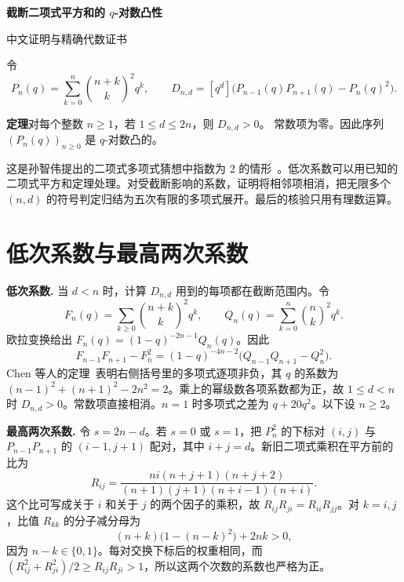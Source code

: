 \documentclass[11pt,UTF8,fontset=fandol,scheme=plain]{ctexart}
\newcommand{\coef}[1]{[q^{#1}]}
\newcommand{\Dx}{D_{n,d}}
\begin{document}
\thispagestyle{empty}
\vspace*{4mm}
{\LARGE\bfseries\color{proofInk}截断二项式平方和的 \(q\)-对数凸性\par}
\vspace{4mm}
{\normalsize\color{proofAccent}中文证明与精确代数证书\par}
\vspace{3mm}

令
\[
  P_n(q)=\sum_{k=0}^{n}\binom{n+k}{k}^{\!2}q^k,
  \qquad \Dx=\coef{d}\bigl(P_{n-1}(q)P_{n+1}(q)-P_n(q)^2\bigr).
\]
\noindent\colorbox{proofPale}{\begin{minipage}{\dimexpr\linewidth-2\fboxsep\relax}
  \vspace{3pt}\textbf{定理}\quad 对每个整数 \(n\ge1\)，若 \(1\le d\le2n\)，则 \(\Dx>0\)。
  常数项为零。因此序列 \((P_n(q))_{n\ge0}\) 是 \(q\)-对数凸的。\vspace{3pt}
\end{minipage}}

这是孙智伟提出的二项式多项式猜想中指数为 \(2\) 的情形~\cite[猜想 1.1(i)]{sun}。低次系数可以用已知的二项式平方和定理处理。对受截断影响的系数，证明将相邻项相消，把无限多个 \((n,d)\) 的符号判定归结为五次有限的多项式展开。最后的核验只用有理数运算。

\section{低次系数与最高两次系数}

\textbf{低次系数.}
当 \(d<n\) 时，计算 \(\Dx\) 用到的每项都在截断范围内。令
\[
  F_n(q)=\sum_{k\ge0}\binom{n+k}{k}^{\!2}q^k,
  \qquad Q_n(q)=\sum_{k=0}^{n}\binom{n}{k}^{\!2}q^k.
\]
欧拉变换给出 \(F_n(q)=(1-q)^{-2n-1}Q_n(q)\)。因此
\[
  F_{n-1}F_{n+1}-F_n^2
  =(1-q)^{-4n-2}\bigl(Q_{n-1}Q_{n+1}-Q_n^2\bigr).
\]
Chen 等人的定理~\cite{chen}表明右侧括号里的多项式逐项非负，其 \(q\) 的系数为 \((n-1)^2+(n+1)^2-2n^2=2\)。乘上的幂级数各项系数都为正，故 \(1\le d<n\) 时 \(\Dx>0\)。常数项直接相消。\(n=1\) 时多项式之差为 \(q+20q^2\)。以下设 \(n\ge2\)。

\textbf{最高两次系数.}
令 \(s=2n-d\)。若 \(s=0\) 或 \(s=1\)，把 \(P_n^2\) 的下标对 \((i,j)\) 与 \(P_{n-1}P_{n+1}\) 的 \((i-1,j+1)\) 配对，其中 \(i+j=d\)。新旧二项式乘积在平方前的比为
\[
  R_{ij}=\frac{ni(n+j+1)(n+j+2)}{(n+1)(j+1)(n+i-1)(n+i)}.
\]
这个比可写成关于 \(i\) 和关于 \(j\) 的两个因子的乘积，故 \(R_{ij}R_{ji}=R_{ii}R_{jj}\)。对 \(k=i,j\)，比值 \(R_{kk}\) 的分子减分母为
\[
  (n+k)\bigl(1-(n-k)^2\bigr)+2nk>0,
\]
因为 \(n-k\in\{0,1\}\)。每对交换下标后的权重相同，而 \((R_{ij}^2+R_{ji}^2)/2\ge R_{ij}R_{ji}>1\)，所以这两个次数的系数也严格为正。
\end{document}
